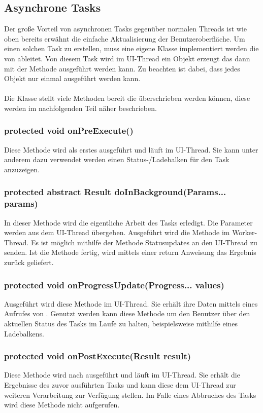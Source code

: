 \subsection{Asynchrone Tasks}
Der große Vorteil von asynchronen Tasks gegenüber normalen Threads ist wie oben bereits erwähnt die einfache Aktualisierung der Benutzeroberfläche. Um einen solchen Task zu erstellen, muss eine eigene Klasse implementiert werden die von  ableitet. Von diesem Task wird im UI-Thread ein Objekt erzeugt das dann mit der  Methode ausgeführt werden kann. Zu beachten ist dabei, dass jedes Objekt nur einmal ausgeführt werden kann.\cite{35}\cite{36}
\\
\\
Die  Klasse stellt viele Methoden bereit die überschrieben werden können, diese werden im nachfolgenden Teil näher beschrieben.

\subsubsection{protected void onPreExecute()}
Diese Methode wird als erstes ausgeführt und läuft im UI-Thread. Sie kann unter anderem dazu verwendet werden einen Status-/Ladebalken für den Task anzuzeigen.\cite{36}

\subsubsection{protected abstract Result doInBackground(Params... params)}
In dieser Methode wird die eigentliche Arbeit des Tasks erledigt. Die Parameter werden aus dem UI-Thread übergeben. Ausgeführt wird die Methode im Worker-Thread. Es ist möglich mithilfe der  Methode Statusupdates an den UI-Thread zu senden. Ist die Methode fertig, wird mittels einer return Anweisung das Ergebnis zurück geliefert.\cite{36}

\subsubsection{protected void onProgressUpdate(Progress... values)}
Ausgeführt wird diese Methode im UI-Thread. Sie erhält ihre Daten mittels eines Aufrufes von . Genutzt werden kann diese Methode um den Benutzer über den aktuellen Status des Tasks im Laufe zu halten, beispielsweise mithilfe eines Ladebalkens.\cite{36}

\subsubsection{protected void onPostExecute(Result result)}
Diese Methode wird nach  ausgeführt und läuft im UI-Thread. Sie erhält die Ergebnisse des zuvor ausführten Tasks und kann diese dem UI-Thread zur weiteren Verarbeitung zur Verfügung stellen. Im Falle eines Abbruches des Tasks wird diese Methode nicht aufgerufen.\cite{36}

